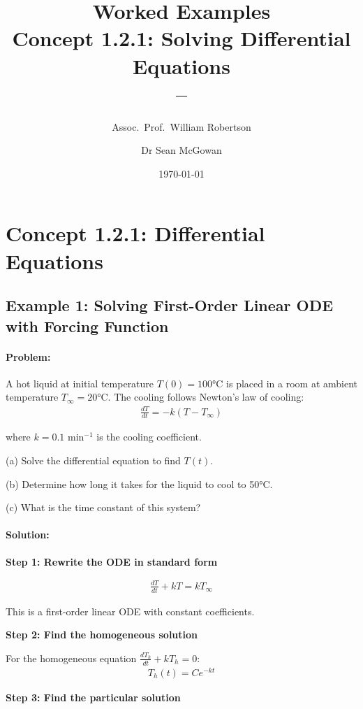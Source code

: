 \documentclass[11pt,a4paper]{article}
\title{\textbf{Worked Examples}\\[0.5em]
\large Concept 1.2.1: Solving Differential Equations\\[0.3em]
\normalsize \coursesubtitle{} -- \coursetitle}
\author{Assoc.\ Prof.\ William Robertson \and Dr Sean McGowan}
\date{\today}
\begin{document}
\maketitle
\tableofcontents
\newpage

\section{Concept 1.2.1: Differential Equations}

\subsection{Example 1: Solving First-Order Linear ODE with Forcing Function}

\paragraph{Problem:} A hot liquid at initial temperature $T(0) = 100$°C is placed in a room at ambient temperature $T_{\infty} = 20$°C. The cooling follows Newton's law of cooling:
\begin{align}
  \frac{dT}{dt} = -k(T - T_{\infty})
\end{align}

where $k = 0.1$ min$^{-1}$ is the cooling coefficient.

(a) Solve the differential equation to find $T(t)$.

(b) Determine how long it takes for the liquid to cool to 50°C.

(c) What is the time constant of this system?

\paragraph{Solution:}

\textbf{Step 1: Rewrite the ODE in standard form}

\begin{align}
  \frac{dT}{dt} + kT = kT_{\infty}
\end{align}

This is a first-order linear ODE with constant coefficients.

\textbf{Step 2: Find the homogeneous solution}

For the homogeneous equation $\frac{dT_h}{dt} + kT_h = 0$:
\begin{align}
  T_h(t) = Ce^{-kt}
\end{align}

\textbf{Step 3: Find the particular solution}
\end{document}

